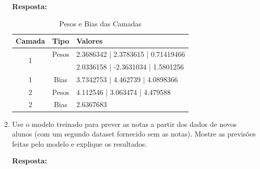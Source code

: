 \documentclass[12 pt]{article}
\begin{document}
\begin{enumerate}
    \textbf{Resposta:} \par

    \begin{table}[H]
        \centering
        \caption{Pesos e Bias das Camadas}
        \begin{tabular}{|c|c|l|}
            \hline
            \textbf{Camada} & \textbf{Tipo} & \textbf{Valores} \\
            \hline
            \multirow{2}{*}{1} & Pesos & 2.3686342 | 2.3783615 | 0.71419466 \\
                               &       & 2.0336158 | -2.3631034 | 1.5801256 \\
            \hline
            1 & Bias   & 3.7342753 | 4.462739 | 4.0898366 \\
            \hline
            2 & Pesos & 4.112546 | 3.063474 | 4.479588 \\
            \hline
            2 & Bias   & 2.6367683 \\
            \hline
        \end{tabular}
    \end{table}

    \item Use o modelo treinado para prever as notas a partir dos dados de novos alunos (com um segundo dataset fornecido sem as notas). Mostre as previsões feitas pelo modelo e explique os resultados.
       
    \textbf{Resposta:} \par


\end{enumerate}
\end{document}
